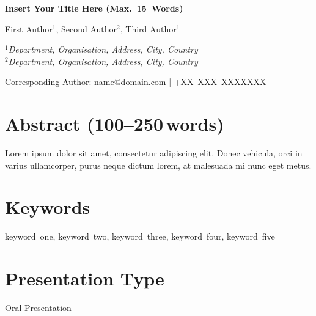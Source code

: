 \documentclass[12pt]{article}
\newcommand{\papertitle}[1]{%
  \begin{center}
    \fontsize{14pt}{16pt}\selectfont\textbf{#1}
  \end{center}
  \vspace{1em}}
\newcommand{\paperauthors}[1]{%
  \begin{center}
    \fontsize{12pt}{14pt}\selectfont #1
  \end{center}}
\newcommand{\affiliations}[1]{%
  \begin{center}
    \fontsize{11pt}{13pt}\selectfont\textit{#1}
  \end{center}}
\newcommand{\correspondingauthor}[1]{%
  \begin{center}
    \fontsize{10pt}{12pt}\selectfont #1
  \end{center}
  \vspace{1.5em}}
\begin{document}

\papertitle{Insert Your Title Here (Max. 15 Words)}

\paperauthors{First Author$^{1}$, Second Author$^{2}$, Third Author$^{1}$}

\affiliations{$^{1}$Department, Organisation, Address, City, Country\\
$^{2}$Department, Organisation, Address, City, Country}

\correspondingauthor{*Corresponding Author: name@domain.com \;|\; +XX XXX XXXXXXX}

\section*{Abstract (100--250\,words)}
Lorem ipsum dolor sit amet, consectetur adipiscing elit. Donec vehicula, orci in varius ullamcorper, purus neque dictum lorem, at malesuada mi nunc eget metus. %

\section*{Keywords}
keyword one, keyword two, keyword three, keyword four, keyword five

\section*{Presentation Type}
Oral Presentation

\end{document}
